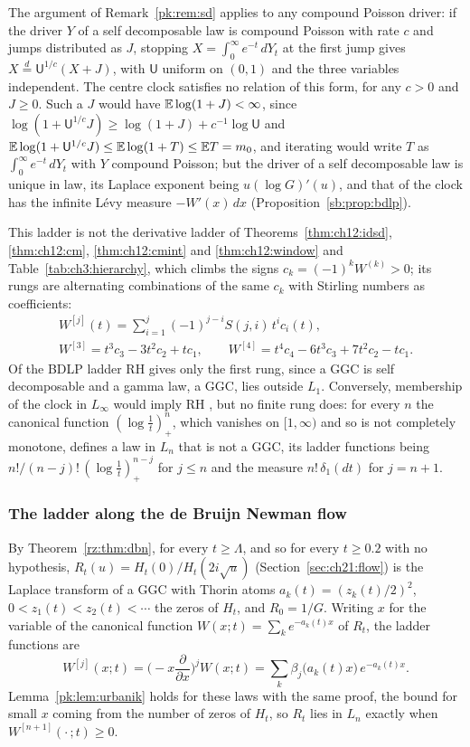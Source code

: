 \begin{remark}\label{pk:rem:perpetuity}
The argument of Remark~\ref{pk:rem:sd} applies to any compound Poisson driver: if the driver $Y$ of a self decomposable law is compound Poisson with rate $c$ and jumps distributed as $J$, stopping $X=\int_0^\infty e^{-t}\,dY_t$ at the first jump gives $X\stackrel d=\mathsf U^{1/c}(X+J)$, with $\mathsf U$ uniform on $(0,1)$ and the three variables independent. The centre clock satisfies no relation of this form, for any $c>0$ and $J\ge0$. Such a $J$ would have $\mathbb{E}\log(1+J)<\infty$, since $\log(1+\mathsf U^{1/c}J)\ge\log(1+J)+c^{-1}\log\mathsf U$ and $\mathbb{E}\log(1+\mathsf U^{1/c}J)\le\mathbb{E}\log(1+T)\le\mathbb{E} T=m_0$, and iterating would write $T$ as $\int_0^\infty e^{-t}\,dY_t$ with $Y$ compound Poisson; but the driver of a self decomposable law is unique in law, its Laplace exponent being $u(\log G)'(u)$, and that of the clock has the infinite L\'evy measure $-W'(x)\,dx$ (Proposition~\ref{sb:prop:bdlp}).
\end{remark}

This ladder is not the derivative ladder of Theorems~\ref{thm:ch12:idsd}, \ref{thm:ch12:cm}, \ref{thm:ch12:cmint} and \ref{thm:ch12:window} and Table~\ref{tab:ch3:hierarchy}, which climbs the signs $c_k=(-1)^kW^{(k)}>0$; its rungs are alternating combinations of the same $c_k$ with Stirling numbers as coefficients:
\begin{gather*}
W^{[j]}(t)=\sum_{i=1}^j(-1)^{j-i}S(j,i)\,t^ic_i(t),\\
W^{[3]}=t^3c_3-3t^2c_2+tc_1,\qquad W^{[4]}=t^4c_4-6t^3c_3+7t^2c_2-tc_1 .
\end{gather*}
Of the BDLP ladder RH gives only the first rung, since a GGC is self decomposable and a gamma law, a GGC, lies outside $L_1$. Conversely, membership of the clock in $L_\infty$ would imply RH \cite[Section 4]{BergForst83}, but no finite rung does: for every $n$ the canonical function $(\log\frac1t)_+^n$, which vanishes on $[1,\infty)$ and so is not completely monotone, defines a law in $L_n$ that is not a GGC, its ladder functions being $n!/(n-j)!\,(\log\frac1t)_+^{n-j}$ for $j\le n$ and the measure $n!\,\delta_1(dt)$ for $j=n+1$.

\subsubsection{The ladder along the de Bruijn Newman flow}\label{pk:sec:heatladder}

By Theorem~\ref{rz:thm:dbn}, for every $t\ge\Lambda$, and so for every $t\ge0.2$ with no hypothesis, $R_t(u)=H_t(0)/H_t(2i\sqrt u)$ (Section~\ref{sec:ch21:flow}) is the Laplace transform of a GGC with Thorin atoms $a_k(t)=(z_k(t)/2)^2$, $0<z_1(t)<z_2(t)<\cdots$ the zeros of $H_t$, and $R_0=1/G$. Writing $x$ for the variable of the canonical function $W(x;t)=\sum_ke^{-a_k(t)x}$ of $R_t$, the ladder functions are
\[
W^{[j]}(x;t)=\Big(-x\frac\partial{\partial x}\Big)^jW(x;t)=\sum_k\beta_j\big(a_k(t)x\big)\,e^{-a_k(t)x}.
\]
Lemma~\ref{pk:lem:urbanik} holds for these laws with the same proof, the bound for small $x$ coming from the number of zeros of $H_t$, so $R_t$ lies in $L_n$ exactly when $W^{[n+1]}(\cdot\,;t)\ge0$.

